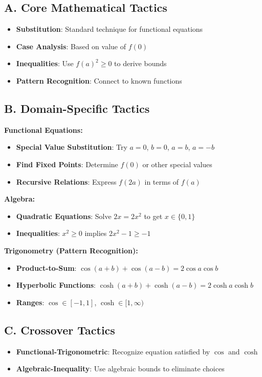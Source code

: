 \documentclass[12pt]{article}
\begin{document}
\begin{tacticalbox}
\subsection*{A. Core Mathematical Tactics}
\begin{itemize}[leftmargin=*]
    \item \textbf{Substitution}: Standard technique for functional equations
    \item \textbf{Case Analysis}: Based on value of $f(0)$
    \item \textbf{Inequalities}: Use $f(a)^2 \geq 0$ to derive bounds
    \item \textbf{Pattern Recognition}: Connect to known functions
\end{itemize}

\subsection*{B. Domain-Specific Tactics}

\textbf{Functional Equations:}
\begin{itemize}[leftmargin=*]
    \item \textbf{Special Value Substitution}: Try $a = 0$, $b = 0$, $a = b$, $a = -b$
    \item \textbf{Find Fixed Points}: Determine $f(0)$ or other special values
    \item \textbf{Recursive Relations}: Express $f(2a)$ in terms of $f(a)$
\end{itemize}

\textbf{Algebra:}
\begin{itemize}[leftmargin=*]
    \item \textbf{Quadratic Equations}: Solve $2x = 2x^2$ to get $x \in \{0, 1\}$
    \item \textbf{Inequalities}: $x^2 \geq 0$ implies $2x^2 - 1 \geq -1$
\end{itemize}

\textbf{Trigonometry (Pattern Recognition):}
\begin{itemize}[leftmargin=*]
    \item \textbf{Product-to-Sum}: $\cos(a+b) + \cos(a-b) = 2\cos a \cos b$
    \item \textbf{Hyperbolic Functions}: $\cosh(a+b) + \cosh(a-b) = 2\cosh a \cosh b$
    \item \textbf{Ranges}: $\cos \in [-1, 1]$, $\cosh \in [1, \infty)$
\end{itemize}

\subsection*{C. Crossover Tactics}
\begin{itemize}[leftmargin=*]
    \item \textbf{Functional-Trigonometric}: Recognize equation satisfied by $\cos$ and $\cosh$
    \item \textbf{Algebraic-Inequality}: Use algebraic bounds to eliminate choices
\end{itemize}
\end{tacticalbox}
\end{document}

